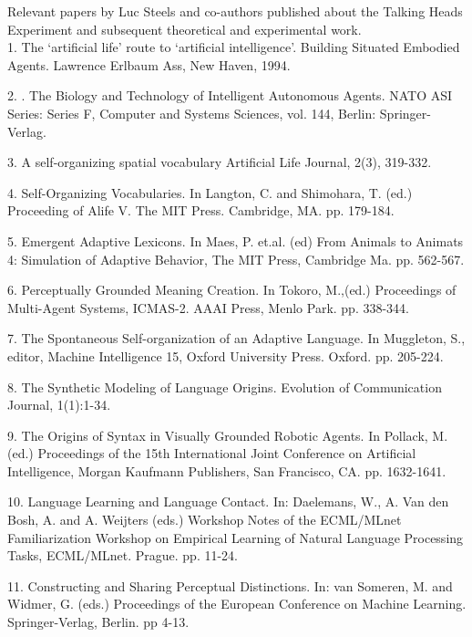 
\label{c:references}

Relevant papers by Luc Steels and co-authors published about the Talking Heads Experiment and subsequent theoretical 
and experimental work. \\

1. \citet{Steels:94a} The `artificial life' route to `artificial intelligence'. Building Situated Embodied Agents. Lawrence Erlbaum Ass, New Haven, 1994.

2. \citet{Steels:95a}. The Biology and Technology of Intelligent Autonomous Agents. NATO ASI Series: Series F, Computer and Systems Sciences, vol. 144, Berlin: Springer-Verlag.

3. \citet{Steels:95b} A self-organizing spatial vocabulary Artificial Life Journal, 2(3), 319-332. 

4. \citet{Steels:96a} Self-Organizing Vocabularies. In Langton, C. and Shimohara, T. (ed.) Proceeding of 
Alife V. The MIT Press. Cambridge, MA. pp. 179-184. 

5. \citet{Steels:96b} Emergent Adaptive Lexicons. In Maes, P. et.al. (ed) From Animals to Animats 4: Simulation of Adaptive Behavior, The MIT Press, Cambridge Ma. pp. 562-567. 

6. \citet{Steels:96c} Perceptually Grounded Meaning Creation. In Tokoro, M.,(ed.) Proceedings of Multi-Agent Systems, ICMAS-2. AAAI Press, Menlo Park. pp. 338-344. 

7. \citet{Steels:97a} The Spontaneous Self-organization of an Adaptive Language. In Muggleton, S., editor, Machine Intelligence 15, Oxford University Press. Oxford. pp. 205-224. 

8. \citet{Steels:97b} The Synthetic Modeling of Language Origins. Evolution of Communication Journal, 1(1):1-34. 

9. \citet{Steels:97c} The Origins of Syntax in Visually Grounded Robotic Agents. In Pollack, M. (ed.) Proceedings of the 15th International Joint Conference on Artificial Intelligence, Morgan Kaufmann Publishers, San Francisco, CA. pp. 1632-1641. 

10. \citet{Steels:97d} Language Learning and Language Contact. In: Daelemans, W., A. Van den Bosh, A. and A. Weijters (eds.)
Workshop Notes of the ECML/MLnet Familiarization Workshop on Empirical Learning of Natural Language 
Processing Tasks, ECML/MLnet. Prague. pp. 11-24. 

11. \citet{Steels:97e} Constructing and Sharing Perceptual Distinctions. In: van Someren, M. and Widmer, G. (eds.) Proceedings of the European Conference on Machine Learning. Springer-Verlag, Berlin. pp 4-13. 

